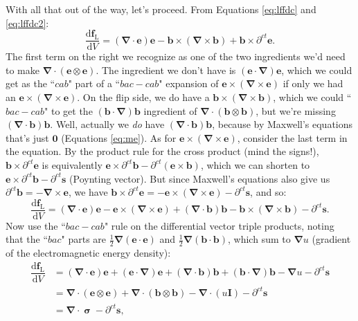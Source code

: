 \documentclass[12pt]{article}
\renewcommand{\vv}[1]{\mathbf{#1}}
\newcommand{\dd}[1]{\mathrm{d}#1}
\newcommand{\vvsigma}{\bm{\upsigma}}
\newcommand{\del}{\boldsymbol{\nabla}}
\begin{document}
With all that out of the way, let's proceed. From Equations \ref{eq:lffdc} and \ref{eq:lffdc2}:
\begin{equation*}
\dfrac{\dd \vv f_{\mathrm{L}}}{\dd V} = \left( \del \cdot \vv e \right) \vv e - \vv b \times \left( \del \times \vv b \right) + \vv b \times \partial^{ct} \vv e .
\end{equation*}
The first term on the right we recognize as one of the two ingredients we'd need to make $\del \cdot (\vv e \otimes \vv e)$. The ingredient we don't have is $(\vv e \cdot \del) \vv e$, which we could get as the ``$cab$" part of a ``$bac - cab$" expansion of $\vv e \times (\del \times \vv e)$ if only we had an $\vv e \times (\del \times \vv e)$. On the flip side, we do have a $\vv b \times (\del \times \vv b)$, which we could ``$bac - cab$" to get the $(\vv b \cdot \del) \vv b$ ingredient of $\del \cdot (\vv b \otimes \vv b)$, but we're missing $(\del \cdot \vv b) \vv b$. Well, actually we \emph{do} have $(\del \cdot \vv b) \vv b$, because by Maxwell's equations that's just $\vv 0$ (Equations \ref{eq:me}). As for $\vv e \times (\del \times \vv e)$, consider the last term in the equation. By the product rule for the cross product (mind the signs!), $\vv b \times \partial^{ct} \vv e$ is equivalently $\vv e \times \partial^{ct} \vv b - \partial^{ct} \left( \vv e \times \vv b \right)$, which we can shorten to $\vv e \times \partial^{ct} \vv b - \partial^{ct} \vv s$ (Poynting vector). But since Maxwell's equations also give us $\partial^{ct} \vv b = - \del \times \vv e$, we have $\vv b \times \partial^{ct} \vv e = - \vv e \times (\del \times \vv e) - \partial^{ct} \vv s$, and so:
\begin{equation*}
\dfrac{\dd \vv f_{\mathrm{L}}}{\dd V} = \left( \del \cdot \vv e \right) \vv e - \vv e \times (\del \times \vv e) + (\del \cdot \vv b) \vv b - \vv b \times \left( \del \times \vv b \right) - \partial^{ct} \vv s .
\end{equation*}
Now use the ``$bac - cab$" rule on the differential vector triple products, noting that the ``$bac$" parts are $\frac{1}{2} \del (\vv e \cdot \vv e)$ and $\frac{1}{2} \del (\vv b \cdot \vv b)$, which sum to $\del u$ (gradient of the electromagnetic energy density):
\begin{equation*}
\begin{aligned}
\dfrac{\dd \vv f_{\mathrm{L}}}{\dd V} &= \left( \del \cdot \vv e \right) \vv e + \left( \vv e \cdot \del \right) \vv e + (\del \cdot \vv b) \vv b + \left( \vv b \cdot \del \right) \vv b - \del u - \partial^{ct} \vv s \\
&= \del \cdot (\vv e \otimes \vv e) + \del \cdot (\vv b \otimes \vv b) - \del \cdot (u \vv I) - \partial^{ct} \vv s \\[2pt]
&= \del \cdot \vvsigma - \partial^{ct} \vv s ,
\end{aligned}
\end{equation*}
\end{document}

